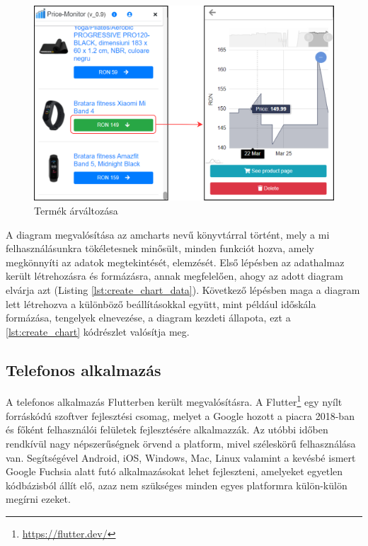 \begin{figure}[H]
    \centering
    \includegraphics[scale=1]{figures/images/home_details.png}
    \caption{Termék árváltozása}
    \label{fig:ext_chart}
\end{figure}

A diagram megvalósítása az amcharts nevű könyvtárral történt, mely a mi felhasználásunkra tökéletesnek minősült, minden funkciót hozva, amely megkönnyíti az adatok megtekintését, elemzését. Első lépésben az adathalmaz került létrehozásra és formázásra, annak megfelelően, ahogy az adott diagram elvárja azt (Listing \ref{lst:create_chart_data}). Következő lépésben maga a diagram lett létrehozva a különböző beállításokkal együtt, mint például időskála formázása, tengelyek elnevezése, a diagram kezdeti állapota, ezt a \ref{lst:create_chart} kódrészlet valósítja meg.







\subsection{Telefonos alkalmazás}

A telefonos alkalmazás Flutterben került megvalósításra. A Flutter\footnote{\url{https://flutter.dev/}} egy nyílt forráskódú szoftver fejlesztési csomag, melyet a Google hozott a piacra 2018-ban és főként felhasználói felületek fejlesztésére alkalmazzák. Az utóbbi időben rendkívül nagy népszerűségnek örvend a platform, mivel széleskörű felhasználása van. Segítségével Android, iOS, Windows, Mac, Linux valamint a kevésbé ismert Google Fuchsia alatt futó alkalmazásokat lehet fejleszteni, amelyeket egyetlen kódbázisból állít elő, azaz nem szükséges minden egyes platformra külön-külön megírni ezeket.

